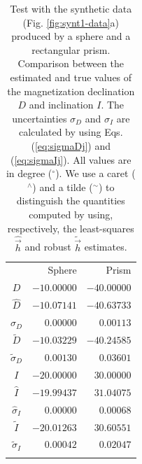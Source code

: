 \documentclass[journal abbreviation, npg]{copernicus}
\begin{document}






\begin{table}[t]
\caption{Test with the synthetic data (Fig. \ref{fig:synt1-data}a) produced by a sphere and a rectangular prism. Comparison between the estimated and true values of the magnetization declination $D$ and inclination $I$. The uncertainties $\sigma_{D}$ and $\sigma_{I}$ are calculated by using Eqs. (\ref{eq:sigmaDj}) and (\ref{eq:sigmaIj}). All values are in degree ($^{\circ}$). We use a caret ($^{\wedge}$) and a tilde ($^{\sim}$) to distinguish the quantities computed by using, respectively, the least-squares $\hat{\vec{h}}$ and robust $\tilde{\vec{h}}$ estimates.}
\vskip4mm
\centering
\begin{tabular}{crr}
\tophline
& Sphere & Prism \\
\middlehline
$D$ & $-10.00000$ & $-40.00000$ \\
$\hat{D}$ & $-10.07141$ & $-40.63733$ \\
$\hat{\sigma}_{D}$ & $0.00000$ & $0.00113$  \\
$\tilde{D}$ & $-10.03229$ & $-40.24585$ \\
$\tilde{\sigma}_{D}$ & $0.00130$ & $0.03601$ \\
$I$ & $-20.00000$ & $30.00000$ \\
$\hat{I}$ & $-19.99437$ & $31.04075$  \\
$\hat{\sigma}_{I}$ & $0.00000$ & $0.00068$  \\
$\tilde{I}$ & $-20.01263$ & $30.60551$ \\
$\tilde{\sigma}_{I}$ & $0.00042$ & $0.02047$ \\
\bottomhline
\end{tabular}
\label{tab:synt1-without-inter-anomaly}
\end{table}
\end{document}
